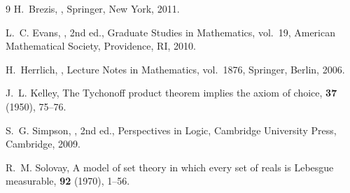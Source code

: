 \documentclass[11pt,reqno]{amsart}
\begin{document}
\begin{thebibliography}{9}
 H.~Brezis, , \newblock Springer, New York,
2011.

 L.~C. Evans, , 2nd ed., \newblock Graduate Studies in Mathematics, vol.~19, %
\newblock American Mathematical Society, Providence, RI, 2010.

 H.~Herrlich, , %
\newblock Lecture Notes in Mathematics, vol.~1876, \newblock Springer,
Berlin, 2006.

 J.~L. Kelley, \newblock The Tychonoff product theorem
implies the axiom of choice,  {\bf 37} (1950),
75--76.

 S.~G. Simpson, , 2nd ed., \newblock Perspectives in Logic, \newblock %
Cambridge University Press, Cambridge, 2009.

 R.~M. Solovay, \newblock A model of set theory in
which every set of reals is Lebesgue measurable,  {\bf 92} (1970), 1--56.
\end{thebibliography}
\end{document}
